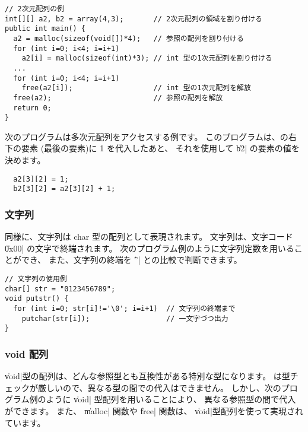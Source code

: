 
\begin{mylist}
\begin{verbatim}
// 2次元配列の例
int[][] a2, b2 = array(4,3);       // 2次元配列の領域を割り付ける
public int main() {
  a2 = malloc(sizeof(void[])*4);   // 参照の配列を割り付ける
  for (int i=0; i<4; i=i+1)
    a2[i] = malloc(sizeof(int)*3); // int 型の1次元配列を割り付ける
  ...
  for (int i=0; i<4; i=i+1)
    free(a2[i]);                   // int 型の1次元配列を解放
  free(a2);                        // 参照の配列を解放
  return 0;
}
\end{verbatim}
\end{mylist}

次のプログラムは多次元配列をアクセスする例です。
このプログラムは、の右下の要素
(最後の要素)に 1 を代入したあと、
それを使用して \|b2| の要素の値を決めます。

\begin{mylist}
\begin{verbatim}
  a2[3][2] = 1;
  b2[3][2] = a2[3][2] + 1;
\end{verbatim}
\end{mylist}

\subsubsection{文字列}

\cl 同様に、文字列は char 型の配列として表現されます。
文字列は、文字コード \|0x00| の文字で終端されます。
次のプログラム例のように文字列定数を用いることができ、
また、文字列の終端を \|'\0'| との比較で判断できます。

\begin{mylist}
\begin{verbatim}
// 文字列の使用例
char[] str = "0123456789";
void putstr() {
  for (int i=0; str[i]!='\0'; i=i+1)  // 文字列の終端まで
    putchar(str[i]);                  // 一文字づつ出力
}
\end{verbatim}
\end{mylist}

\subsubsection{ void 配列}

\|void|型の配列は、どんな参照型とも互換性がある特別な型になります。
\cmml は型チェックが厳しいので、異なる型の間での代入はできません。
しかし、次のプログラム例のように \|void| 型配列を用いることにより、
異なる参照型の間で代入ができます。
また、 \|malloc| 関数や \|free| 関数は、
\|void|型配列を使って実現されています。

